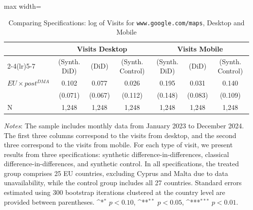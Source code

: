 \documentclass[11pt]{article}
\begin{document}
	
	\begin{table}[ht!]
		\centering
		\def\sym#1{\ifmmode^{#1}\else\(^{#1}\)\fi}
		\caption{\label{tab:sdid_traffic} Comparing Specifications: log of Visits for \texttt{www.google.com/maps}, Desktop and Mobile}
		\begin{threeparttable}
			\begin{adjustbox}{max width=\linewidth}
				\begin{tabular}{lcccccc}
					\hline \noalign{\smallskip} 
					& \multicolumn{3}{c}{Visits Desktop} & \multicolumn{3}{c}{Visits Mobile}  \\ \cmidrule(lr){2-4}\cmidrule(lr){5-7}
					
					&(Synth. DiD)   &       (DiD)   &(Synth. Control)   &(Synth. DiD)   &       (DiD)   &(Synth. Control)   \\
					\midrule
					$ EU \times post^{DMA} $ &       0.102   &       0.077   &       0.026   &       0.195   &       0.031   &       0.140   \\
					&     (0.071)   &     (0.067)   &     (0.112)   &     (0.148)   &     (0.083)   &     (0.109)   \\
					
					N                   &       1,248   &       1,248   &       1,248   &       1,248   &       1,248   &       1,248   \\
					\midrule
					
				\end{tabular}
			\end{adjustbox}
			\begin{tablenotes}
				\item \footnotesize \emph{Notes}: The sample includes monthly data from January 2023 to December 2024. The first three columns correspond to the visits from desktop, and the second three correspond to the visits from mobile. For each type of visit, we present results from three specifications: synthetic difference-in-differences, classical difference-in-differences, and synthetic control. In all specifications, the treated group comprises 25 EU countries, excluding Cyprus and Malta due to data unavailability, while the control group includes all 27 countries. Standard errors estimated using 300 bootstrap iterations clustered at the country level are provided between parentheses. \sym{*} \(p<0.10\), \sym{**} \(p<0.05\), \sym{***}  \(p<0.01\). 
			\end{tablenotes}
		\end{threeparttable}
	\end{table}
	
\end{document}
